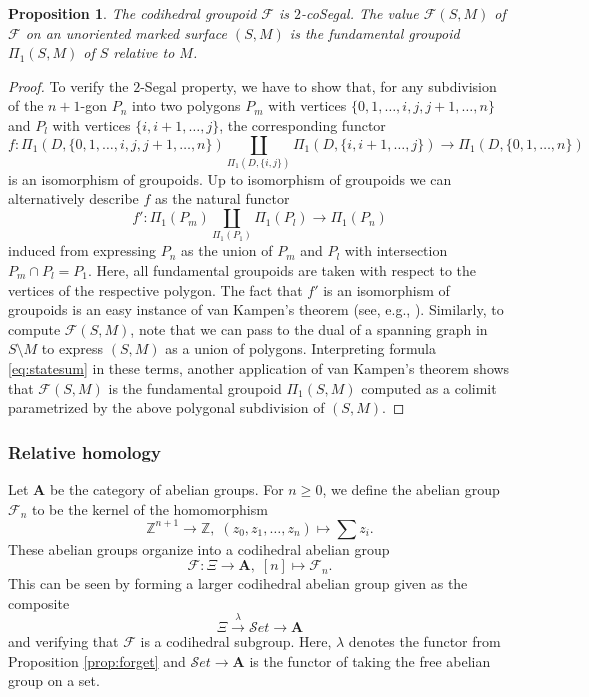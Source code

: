 \documentclass[english,11pt,leqno]{article}
\def\ZZ{\mathbb{Z}}
\def\scrF{\mathscr{F}}
\def\F{\scrF}
\def\Ab{\mathbf{A}}
\def\lra{\longrightarrow}
\def\Set{ {\mathcal Set}}
\def\Set{ {\mathcal Set}}
\newtheorem{prop}[thm]{Proposition}
\theoremstyle{definition}
\theoremstyle{remark}
\numberwithin{equation}{section}
\begin{document}
\begin{prop}\label{prop:kampen} The codihedral groupoid $\F$ is $2$-coSegal. The value $\F(S,M)$ of $\F$ on an
	unoriented marked surface $(S,M)$ is the fundamental groupoid $\Pi_1(S,M)$ of $S$ relative
	to $M$.
\end{prop}
\begin{proof}
To verify the $2$-Segal property, we have to show that, for any subdivision of the $n+1$-gon $P_n$
into two polygons $P_m$ with vertices $\{0,1,\dots, i, j, j+1, \dots, n\}$ and $P_l$ with vertices
$\{i,i+1,\dots, j\}$, the corresponding functor
\[
	f: \Pi_1(D, \{0,1,\dots, i, j, j+1, \dots, n\}) \coprod_{\Pi_1(D, \{i,j\})} \Pi_1(D, \{i,i+1,\dots, j\}) \lra \Pi_1(D,\{0,1,\dots,n\})
\]
is an isomorphism of groupoids. Up to isomorphism of groupoids we can alternatively describe $f$
as the natural functor
\[
	f': \Pi_1(P_m) \coprod_{\Pi_1(P_1)} \Pi_1(P_l) \lra \Pi_1(P_n)
\]
induced from expressing $P_n$ as the union of $P_m$ and $P_l$ with intersection $P_m \cap P_l =
P_1$. Here, all fundamental groupoids are taken with respect to the vertices of the respective
polygon. The fact that $f'$ is an isomorphism of groupoids is an easy instance of van Kampen's theorem
(see, e.g., \cite[6.7.2]{brown}).
Similarly, to compute $\F(S,M)$, note that we can pass to the dual of a spanning graph in $S
\setminus M$ to express $(S,M)$ as a union of polygons. Interpreting formula \eqref{eq:statesum} in
these terms, another application of van Kampen's theorem shows that $\F(S,M)$ is the fundamental
groupoid $\Pi_1(S,M)$ computed as a colimit parametrized by the above polygonal subdivision of
$(S,M)$.
\end{proof}

\subsubsection{Relative homology}

Let $\Ab$ be the category of abelian groups. For $n \ge 0$, we define the abelian group $\F_n$ to be
the kernel of the homomorphism
\[
	\ZZ^{n+1} \to \ZZ,\; (z_0,z_1,\dots,z_n) \mapsto \sum z_i.
\]
These abelian groups organize into a codihedral abelian group
\[
	\F: \Xi \lra \Ab, \; [n] \mapsto \F_n.
\]
This can be seen by forming a larger codihedral abelian group given as the composite
\[
	\Xi \overset{\lambda}{\lra} \Set \lra \Ab
\]
and verifying that $\F$ is a codihedral subgroup. Here, $\lambda$ denotes the functor from
Proposition \ref{prop:forget} and $\Set \to \Ab$ is the functor of taking the free abelian group
on a set.
\end{document}
